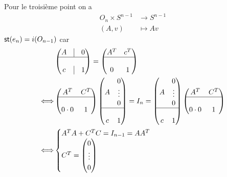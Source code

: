\documentclass[french,a4paper,10pt]{article}
\begin{document}
	\begin{td-sol}[Suite]
		Pour le troisième point on a
			\[\begin{aligned}
				O_n\times S^{n-1}&\to S^{n-1}\\
				(A,v)&\mapsto Av
			\end{aligned}\]
		$\operatorname{\mathsf{st}}(e_n)=i(O_{n-1})$ car
			\[\begin{aligned}
				~&
				\begin{pmatrix}
					A&\vline&0\\
					\hline\\
					c&\vline&1
				\end{pmatrix}
				=
				\begin{pmatrix}
					A^T&c^T\\
					\hline\\
					0&1
				\end{pmatrix}\\
				\Longleftrightarrow&
				\begin{pmatrix}
					A^T&C^T\\
					\hline\\
					0\cdot0&1
				\end{pmatrix}
				\begin{pmatrix}
					A&\begin{matrix}
						0\\\vdots\\0
					\end{matrix}\\
					\hline\\
					c&1
				\end{pmatrix}
				=I_n=
				\begin{pmatrix}
					A&\begin{matrix}
						0\\\vdots\\0
					\end{matrix}\\
					\hline\\
					c&1
				\end{pmatrix}
				\begin{pmatrix}
					A^T&C^T\\
					\hline\\
					0\cdot0&1
				\end{pmatrix}
			\\\Longleftrightarrow&
			\begin{cases}
				A^TA+C^TC=I_{n-1}=AA^T\\
				C^T=\begin{pmatrix}
					0\\\vdots\\0

\end{pmatrix}
\end{cases}
\end{aligned}\]
\end{td-sol}
\end{document}
